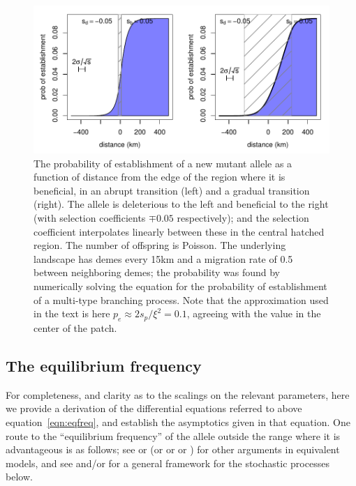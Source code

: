 \documentclass{article}
\newcommand{\citet}[1]{\cite{#1}}
\begin{document}
\begin{figure}[ht!]
    \begin{center}
        \includegraphics{prob-establishment}
    \end{center}
    \caption{The probability of establishment of a new mutant allele as a function of distance from the edge of the region where it is beneficial,
    in an abrupt transition (left) and a gradual transition (right).
    The allele is deleterious to the left and beneficial to the right (with selection coefficients $\mp 0.05$ respectively);
    and the selection coefficient interpolates linearly between these in the central hatched region.
    The number of offspring is Poisson.
    The underlying landscape has demes every 15km and a migration rate of 0.5 between neighboring demes;
    the probability was found by numerically solving the equation for the probability of establishment of a multi-type branching process.
    Note that the approximation used in the text is here $p_e \approx 2 s_p / \xi^2 = 0.1$,
    agreeing with the value in the center of the patch.
    \label{fig:prob_estab_calcs}
    }
\end{figure}



\subsection[Equilibrium Frequency]{The equilibrium frequency}
\label{apx:eqfreq}

For completeness, and clarity as to the scalings on the relevant parameters,
here we provide a derivation of the differential equations referred to above equation~\eqref{eqn:eqfreq},
and establish the asymptotics given in that equation.
One route to the ``equilibrium frequency'' of the allele outside the range where it is advantageous is as follows;
see \citet{slatkin1973geneflow} or \citet{barton1987establishment}
(or \citet{KPP1937book} or \citet{fisher1937wave} or \citet{haldane1948theory})
for other arguments in equivalent models,
and see \citet{etheridge2000introduction} and/or \citet{dawson1993measurevalued} for a general framework for the stochastic processes below.
\end{document}
